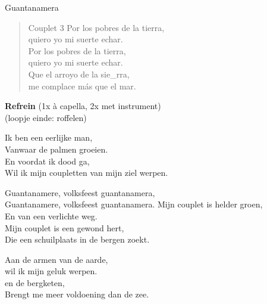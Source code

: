 \begin{song}[son]{Guantanamera}

\begin{verse}{Couplet 3}
  \hspace{1em} Por los pobres de la tierra,\\
  \hspace{1em} quiero yo mi suerte echar.\\
  \hspace{1em} Por los pobres de la tierra,\\
  quiero yo mi suerte echar.\\
  Que el arroyo de la sie\_rra,\\
  me complace m\'{a}s que el mar. \hspace{1em}
\end{verse}

\textbf{Refrein} (1x \`{a} capella, 2x met instrument)\\
(loopje einde:  roffelen)
\end{song}

\clearpage
\begin{translation}
Ik ben een eerlijke man,\\
Vanwaar de palmen groeien.\\
En voordat ik dood ga,\\
Wil ik mijn coupletten van mijn ziel werpen.\vspace{\wlskip}

Guantanamere, volksfeest guantanamera,\\
Guantanamere, volksfeest guantanamera.\vspace{\wlskip}
Mijn couplet is helder groen,\\
En van een verlichte weg.\\
Mijn couplet is een gewond hert,\\
Die een schuilplaats in de bergen zoekt.\vspace{\wlskip}

Aan de armen van de aarde,\\
wil ik mijn geluk werpen.\\
en de bergketen,\\
Brengt me meer voldoening dan de zee.\\
\end{translation}

